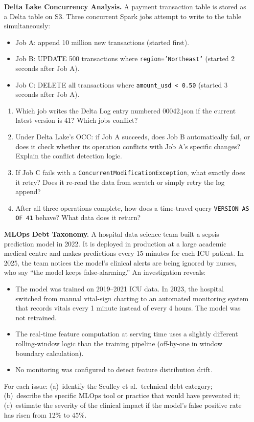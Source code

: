 
\ap \textbf{Delta Lake Concurrency Analysis.}
A payment transaction table is stored as a Delta table on S3. Three
concurrent Spark jobs attempt to write to the table simultaneously:
\begin{itemize}
  \item Job A: append 10 million new transactions (started first).
  \item Job B: UPDATE 500 transactions where \texttt{region='Northeast'}
        (started 2 seconds after Job A).
  \item Job C: DELETE all transactions where \texttt{amount\_usd < 0.50}
        (started 3 seconds after Job A).
\end{itemize}
\begin{enumerate}[label=(\alph*)]
  \item Which job writes the Delta Log entry numbered 00042.json if
        the current latest version is 41? Which jobs conflict?
  \item Under Delta Lake's OCC: if Job A succeeds, does Job B automatically
        fail, or does it check whether its operation conflicts with Job A's
        specific changes? Explain the conflict detection logic.
  \item If Job C fails with a \texttt{ConcurrentModificationException},
        what exactly does it retry? Does it re-read the data from scratch
        or simply retry the log append?
  \item After all three operations complete, how does a time-travel query
        \texttt{VERSION AS OF 41} behave? What data does it return?
\end{enumerate}

\ap \textbf{MLOps Debt Taxonomy.}
A hospital data science team built a sepsis prediction model in 2022.
It is deployed in production at a large academic medical centre and makes
predictions every 15 minutes for each ICU patient. In 2025, the team notices the model's
clinical alerts are being ignored by nurses, who say ``the model keeps
false-alarming.'' An investigation reveals:
\begin{itemize}
  \item The model was trained on 2019--2021 ICU data. In 2023, the hospital
        switched from manual vital-sign charting to an automated monitoring
        system that records vitals every 1 minute instead of every 4 hours.
        The model was not retrained.
  \item The real-time feature computation at serving time uses a slightly
        different rolling-window logic than the training pipeline (off-by-one
        in window boundary calculation).
  \item No monitoring was configured to detect feature distribution drift.
\end{itemize}
For each issue: (a)~identify the Sculley et al.\ technical debt category;
(b)~describe the specific MLOps tool or practice that would have prevented it;
(c)~estimate the severity of the clinical impact if the model's false positive
rate has risen from 12\% to 45\%.

